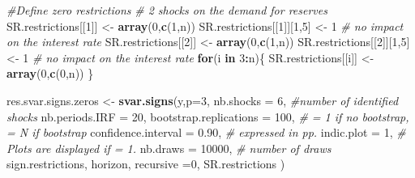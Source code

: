 \documentclass[
  12pt,
]{book}
\newenvironment{Shaded}{\begin{snugshade}}{\end{snugshade}}
\newcommand{\AttributeTok}[1]{\textcolor[rgb]{0.13,0.29,0.53}{#1}}
\newcommand{\CommentTok}[1]{\textcolor[rgb]{0.56,0.35,0.01}{\textit{#1}}}
\newcommand{\ControlFlowTok}[1]{\textcolor[rgb]{0.13,0.29,0.53}{\textbf{#1}}}
\newcommand{\DecValTok}[1]{\textcolor[rgb]{0.00,0.00,0.81}{#1}}
\newcommand{\FloatTok}[1]{\textcolor[rgb]{0.00,0.00,0.81}{#1}}
\newcommand{\FunctionTok}[1]{\textcolor[rgb]{0.13,0.29,0.53}{\textbf{#1}}}
\newcommand{\NormalTok}[1]{#1}
\newcommand{\OtherTok}[1]{\textcolor[rgb]{0.56,0.35,0.01}{#1}}
\newcommand{\SpecialCharTok}[1]{\textcolor[rgb]{0.81,0.36,0.00}{\textbf{#1}}}
\theoremstyle{definition}
\theoremstyle{definition}
\theoremstyle{definition}
\theoremstyle{definition}
\theoremstyle{remark}
\begin{document}
\begin{Shaded}
\begin{Highlighting}[]
\CommentTok{\#Define zero restrictions}
\CommentTok{\# 2 shocks on the demand for reserves}
\NormalTok{SR.restrictions[[}\DecValTok{1}\NormalTok{]] }\OtherTok{\textless{}{-}} \FunctionTok{array}\NormalTok{(}\DecValTok{0}\NormalTok{,}\FunctionTok{c}\NormalTok{(}\DecValTok{1}\NormalTok{,n))}
\NormalTok{SR.restrictions[[}\DecValTok{1}\NormalTok{]][}\DecValTok{1}\NormalTok{,}\DecValTok{5}\NormalTok{] }\OtherTok{\textless{}{-}} \DecValTok{1} \CommentTok{\# no impact on the interest rate}
\NormalTok{SR.restrictions[[}\DecValTok{2}\NormalTok{]] }\OtherTok{\textless{}{-}} \FunctionTok{array}\NormalTok{(}\DecValTok{0}\NormalTok{,}\FunctionTok{c}\NormalTok{(}\DecValTok{1}\NormalTok{,n))}
\NormalTok{SR.restrictions[[}\DecValTok{2}\NormalTok{]][}\DecValTok{1}\NormalTok{,}\DecValTok{5}\NormalTok{] }\OtherTok{\textless{}{-}} \DecValTok{1} \CommentTok{\# no impact on the interest rate}
\ControlFlowTok{for}\NormalTok{(i }\ControlFlowTok{in} \DecValTok{3}\SpecialCharTok{:}\NormalTok{n)\{}
\NormalTok{  SR.restrictions[[i]] }\OtherTok{\textless{}{-}} \FunctionTok{array}\NormalTok{(}\DecValTok{0}\NormalTok{,}\FunctionTok{c}\NormalTok{(}\DecValTok{0}\NormalTok{,n))}
\NormalTok{\}}

\NormalTok{res.svar.signs.zeros }\OtherTok{\textless{}{-}} \FunctionTok{svar.signs}\NormalTok{(y,}\AttributeTok{p=}\DecValTok{3}\NormalTok{,}
                                  \AttributeTok{nb.shocks =} \DecValTok{6}\NormalTok{, }\CommentTok{\#number of identified shocks}
                                  \AttributeTok{nb.periods.IRF =} \DecValTok{20}\NormalTok{,}
                                  \AttributeTok{bootstrap.replications =} \DecValTok{100}\NormalTok{, }\CommentTok{\# = 1 if no bootstrap, = N if bootstrap}
                                  \AttributeTok{confidence.interval =} \FloatTok{0.90}\NormalTok{, }\CommentTok{\# expressed in pp.}
                                  \AttributeTok{indic.plot =} \DecValTok{1}\NormalTok{, }\CommentTok{\# Plots are displayed if = 1.}
                                  \AttributeTok{nb.draws =} \DecValTok{10000}\NormalTok{, }\CommentTok{\# number of draws}
\NormalTok{                                  sign.restrictions,}
\NormalTok{                                  horizon,}
                                  \AttributeTok{recursive =}\DecValTok{0}\NormalTok{,}
\NormalTok{                                  SR.restrictions}
\NormalTok{)}
\end{Highlighting}
\end{Shaded}
\end{document}
